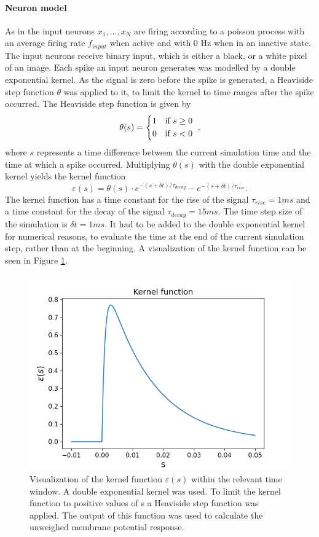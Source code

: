 \paragraph{Neuron model}
As in \citet{nessler} the input neurons $x_1,...,x_N$ are firing according to a poisson process with an average firing rate $f_{input}$ when active and with 0 Hz when in an inactive state. The input neurons receive binary input, which is either a black, or a white pixel of an image. Each spike an input neuron generates was modelled by a double exponential kernel. As the signal is zero before the spike is generated, a Heaviside step function $\theta$ was applied to it, to limit the kernel to time ranges after the spike occurred. The Heaviside step function is given by
\begin{equation}
\theta (s) = \begin{dcases*} 1 & if $s \geq 0$ \\
0 & if $s < 0 $ \end{dcases*},
\end{equation}
where $s$ represents a time difference between the current simulation time and the time at which a spike occurred.
Multiplying $\theta(s)$ with the double exponential kernel yields the kernel function 
\begin{equation}
\varepsilon (s) = \theta (s) \cdot e^{-(s + \delta t) / \tau_{decay}} - e^{-(s + \delta t) / \tau_{rise}}.
\end{equation}
The kernel function has a time constant for the rise of the signal $\tau_{rise} = 1 ms$  and a time constant for the decay of the signal $\tau_{decay} = 15 ms$. The time step size of the simulation is $\delta t = 1 ms$. It had to be added to the double exponential kernel for numerical reasons, to evaluate the time at the end of the current simulation step, rather than at the beginning. A visualization of the kernel function can be seen in Figure \ref{fig:kernelFunction}. 

\begin{figure}
  \centering
  \includegraphics[width=0.6\linewidth]{figures/kernelFunction.png}
  \caption{Visualization of the kernel function $\varepsilon (s)$ within the relevant time window. A double exponential kernel was used. To limit the kernel function to positive values of s a Heaviside step function was applied. The output of this function was used to calculate the unweighed membrane potential response. }
  \label{fig:kernelFunction}
\end{figure}

